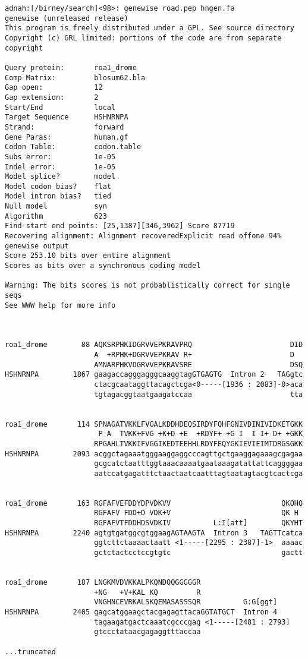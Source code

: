 \documentclass{article}
\begin{document}
\begin{verbatim}
adnah:[/birney/search]<98>: genewise road.pep hngen.fa
genewise (unreleased release)
This program is freely distributed under a GPL. See source directory
Copyright (c) GRL limited: portions of the code are from separate copyright

Query protein:       roa1_drome
Comp Matrix:         blosum62.bla
Gap open:            12
Gap extension:       2
Start/End            local
Target Sequence      HSHNRNPA
Strand:              forward
Gene Paras:          human.gf
Codon Table:         codon.table
Subs error:          1e-05
Indel error:         1e-05
Model splice?        model
Model codon bias?    flat
Model intron bias?   tied
Null model           syn
Algorithm            623
Find start end points: [25,1387][346,3962] Score 87719
Recovering alignment: Alignment recoveredExplicit read offone 94%
genewise output
Score 253.10 bits over entire alignment
Scores as bits over a synchronous coding model

Warning: The bits scores is not probablistically correct for single seqs
See WWW help for more info



roa1_drome        88 AQKSRPHKIDGRVVEPKRAVPRQ                       DID 
                     A  +RPHK+DGRVVEPKRAV R+                       D   
                     AMNARPHKVDGRVVEPKRAVSRE                       DSQ 
HSHNRNPA        1867 gaagaccagggagggcaaggtagGTGAGTG  Intron 2   TAGgtc 
                     ctacgcaataggttacagctcga<0-----[1936 : 2083]-0>aca 
                     tgtagacggtaatgaagatccaa                       tta 


roa1_drome       114 SPNAGATVKKLFVGALKDDHDEQSIRDYFQHFGNIVDINIVIDKETGKK 
                      P A  TVKK+FVG +K+D +E  +RDYF+ +G I  I I+ D+ +GKK 
                     RPGAHLTVKKIFVGGIKEDTEEHHLRDYFEQYGKIEVIEIMTDRGSGKK 
HSHNRNPA        2093 acggctagaaatgggaaggaggcccagttgctgaaggagaaagcgagaa 
                     gcgcatctaatttggtaaacaaaatgaataaagatattattcaggggaa 
                     aatccatgagatttctaactaatcaatttagtaatagtacgtcactcga 


roa1_drome       163 RGFAFVEFDDYDPVDKVV                          QKQHQ 
                     RGFAFV FDD+D VDK+V                          QK H  
                     RGFAFVTFDDHDSVDKIV          L:I[att]        QKYHT 
HSHNRNPA        2240 agtgtgatggcgtggaagAGTAAGTA  Intron 3   TAGTTcatca 
                     ggtcttctaaaactaatt <1-----[2295 : 2387]-1>  aaaac 
                     gctctactcctccgtgtc                          gactt 


roa1_drome       187 LNGKMVDVKKALPKQNDQQGGGGGR                         
                     +NG   +V+KAL KQ         R                         
                     VNGHNCEVRKALSKQEMASASSSQR          G:G[ggt]       
HSHNRNPA        2405 gagcatggaagctacgagagttacaGGTATGCT  Intron 4       
                     tagaagatgactcaaatcgcccgag <1-----[2481 : 2793]    
                     gtccctataacgagaggtttaccaa                         

...truncated

\end{verbatim}
\end{document}
